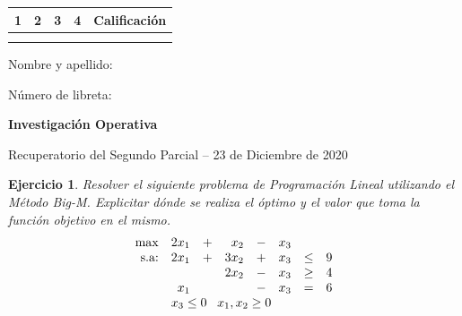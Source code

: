 \documentclass[a4paper,oneside,12pt]{amsart}
\newcommand{\nombremateria}
{Investigaci\'on Operativa}
\newcommand{\numeroparcial}
    { Recuperatorio del Segundo Parcial }
\newcommand{\fecha}
    {23 de Diciembre de 2020}
\newtheorem{quest}{Ejercicio}
\begin{document}
\hfill \hfill
\begin{tabular}[c]{|c|c|c|c|c|}
\hline 
1 & 2 & 3 & 4 & Calificaci\'on \\ \hline \hline
\hspace{1.2 cm} & \hspace{1.2 cm} & \hspace{1.2 cm} & \hspace{1.2 cm} &\hspace{1.5 cm} \\
\hspace{1.2 cm} & \hspace{1.2 cm} & \hspace{1.2 cm} & \hspace{1.2 cm} &\hspace{1.5 cm} \\ \hline

\end{tabular}

\vspace{-1cm}

\noindent Nombre y apellido:

\vspace{0.2cm}

\noindent Número de libreta:

\noindent \hrulefill 

\smallskip
\renewcommand{\baselinestretch}{1.1}

\begin{center}
	\large \textbf{\nombremateria} 
	
	\numeroparcial -- \fecha
\end{center}

\vspace{.6cm}
\renewcommand{\theenumi}{\textbf{\arabic{enumi}}}


\begin{quest} 
Resolver el siguiente problema de Programación Lineal utilizando el Método \mbox{Big-M}. Explicitar dónde se realiza el óptimo y el valor que toma la función objetivo en el mismo.
    \[\begin{array}{rrrrrrrr}
        \max & 2x_1 & + & x_2 & - & x_3  \\
        \text{s.a:} & 2x_1 & + & 3x_2 & + & x_3 & \leq & 9 \\
          &  &  & 2x_2 & - & x_3 & \geq & 4 \\
          & x_1  &  &  & - & x_3 & = & 6 \\
         & \multicolumn{7}{l}{x_3\leq 0 \;\;\;x_1,x_2\geq 0}
    \end{array}
    \]

\end{quest}
\end{document}
